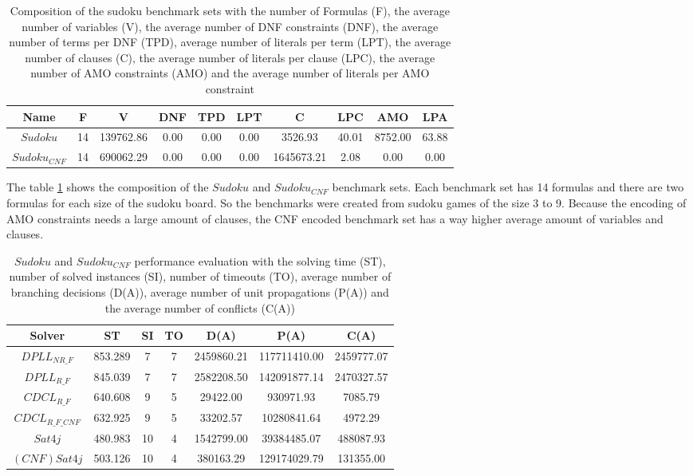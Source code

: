 \begin{table}[!htb]
\centering
\caption[Composition of the sudoku benchmark sets]{Composition of the sudoku benchmark sets with the number of Formulas (F), the average number of variables (V), the average number of DNF constraints (DNF), the average number of terms per DNF (TPD), average number of literals per term (LPT), the average number of clauses (C), the average number of literals per clause (LPC), the average number of AMO constraints (AMO) and the average number of literals per AMO constraint}
\label{tab:sudoku}
\begin{tabular}{|c|c|c|c|c|c|c|c|c|c|}
\hline
Name & F & V & DNF & TPD & LPT & C & LPC & AMO & LPA \\
\hline
$Sudoku$ & 14 & 139762.86 & 0.00 & 0.00 & 0.00 & 3526.93 & 40.01 & 8752.00 & 63.88 \\ 
 \hline 
$Sudoku_{CNF}$ & 14 & 690062.29 & 0.00 & 0.00 & 0.00 & 1645673.21 & 2.08 & 0.00 & 0.00 \\ 
 \hline 
\end{tabular}
\end{table}

The table \ref{tab:sudoku} shows the composition of the $Sudoku$ and $Sudoku_{CNF}$ benchmark sets. Each benchmark set has 14 formulas and there are two formulas for each size of the sudoku board. So the benchmarks were created from sudoku games of the size 3 to 9. Because the encoding of AMO constraints needs a large amount of clauses, the CNF encoded benchmark set has a way higher average amount of variables and clauses.

\begin{table}[!htb]
\centering
\caption[$Sudoku$ and $Sudoku_{CNF}$ performance evaluation]{$Sudoku$ and $Sudoku_{CNF}$ performance evaluation with the solving time (ST), number of solved instances (SI), number of timeouts (TO), average number of branching decisions (D(A)), average number of unit propagations (P(A)) and the average number of conflicts (C(A))}
\label{tab:sudokuSat}
\begin{tabular}{|c|c|c|c|c|c|c|}
\hline
Solver & ST & SI & TO & D(A) & P(A) & C(A)\\ 
\hline
$DPLL_{NR\_F}$ & 853.289 & 7 & 7 & 2459860.21 & 117711410.00 & 2459777.07 \\ 
\hline
$DPLL_{R\_F}$ & 845.039 & 7 & 7 & 2582208.50 & 142091877.14 & 2470327.57 \\ 
\hline
$CDCL_{R\_F}$ & 640.608 & 9 & 5 & 29422.00 & 930971.93 & 7085.79 \\ 
\hline
$CDCL_{R\_F\_CNF}$ & 632.925 & 9 & 5 & 33202.57 & 10280841.64 & 4972.29 \\ 
\hline
$Sat4j$ & 480.983 & 10 & 4 & 1542799.00 & 39384485.07 & 488087.93 \\
\hline
$(CNF)Sat4j$ & 503.126 & 10 & 4 & 380163.29 & 129174029.79 & 131355.00 \\ 
\hline
\end{tabular}
\end{table}

